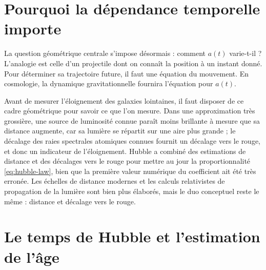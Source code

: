 \section{Pourquoi la dépendance temporelle importe}

La question géométrique centrale s’impose désormais : comment \(a(t)\) varie-t-il ? L’analogie est celle d’un projectile dont on connaît la position à un instant donné. Pour déterminer sa trajectoire future, il faut une équation du mouvement. En cosmologie, la dynamique gravitationnelle fournira l’équation pour \(a(t)\).

\begin{classroomqa}
\end{classroomqa}

Avant de mesurer l’éloignement des galaxies lointaines, il faut disposer de ce cadre géométrique pour savoir ce que l’on mesure. Dans une approximation très grossière, une source de luminosité connue paraît moins brillante à mesure que sa distance augmente, car sa lumière se répartit sur une aire plus grande ; le décalage des raies spectrales atomiques connues fournit un décalage vers le rouge, et donc un indicateur de l’éloignement. Hubble a combiné des estimations de distance et des décalages vers le rouge pour mettre au jour la proportionnalité \eqref{eq:hubble-law}, bien que la première valeur numérique du coefficient ait été très erronée. Les échelles de distance modernes et les calculs relativistes de propagation de la lumière sont bien plus élaborés, mais le duo conceptuel reste le même : distance et décalage vers le rouge.

\section{Le temps de Hubble et l’estimation de l’âge}

